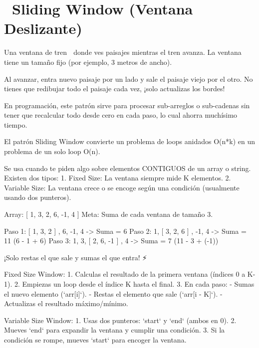 ﻿\chapter[\emj{🪟}~Sliding Window (Ventana Deslizante)]{~Sliding Window (Ventana Deslizante)}

\begin{dsaquees}
Una ventana de tren 🚂 donde ves paisajes mientras el tren avanza. 
La ventana tiene un tamaño fijo (por ejemplo, 3 metros de ancho).

Al avanzar, entra nuevo paisaje por un lado y sale el paisaje viejo
por el otro. No tienes que redibujar todo el paisaje cada vez, ¡solo
actualizas los bordes!

En programación, este patrón sirve para procesar sub-arreglos o 
sub-cadenas sin tener que recalcular todo desde cero en cada paso, 
lo cual ahorra muchísimo tiempo.
\end{dsaquees}
\begin{dsaotraforma}
El patrón Sliding Window convierte un problema de loops anidados O(n*k) 
en un problema de un solo loop O(n). 

Se usa cuando te piden algo sobre elementos CONTIGUOS de un array o 
string. Existen dos tipos:
1. Fixed Size: La ventana siempre mide K elementos.
2. Variable Size: La ventana crece o se encoge según una condición
   (usualmente usando dos punteros).
\end{dsaotraforma}
\begin{dsadiagrama}
Array: [ 1, 3, 2, 6, -1, 4 ]
Meta: Suma de cada ventana de tamaño 3.

Paso 1: [ 1, 3, 2 ] , 6, -1, 4  -> Suma = 6
Paso 2: 1, [ 3, 2, 6 ] , -1, 4  -> Suma = 11 (6 - 1 + 6)
Paso 3: 1, 3, [ 2, 6, -1 ] , 4  -> Suma = 7  (11 - 3 + (-1))

¡Solo restas el que sale y sumas el que entra! ⚡
\end{dsadiagrama}
\begin{dsacomofunciona}
Fixed Size Window:
1. Calculas el resultado de la primera ventana (índices 0 a K-1).
2. Empiezas un loop desde el índice K hasta el final.
3. En cada paso:
   - Sumas el nuevo elemento (`arr[i]`).
   - Restas el elemento que sale (`arr[i - K]`).
   - Actualizas el resultado máximo/mínimo.

Variable Size Window:
1. Usas dos punteros: `start` y `end` (ambos en 0).
2. Mueves `end` para expandir la ventana y cumplir una condición.
3. Si la condición se rompe, mueves `start` para encoger la ventana.
\end{dsacomofunciona}
